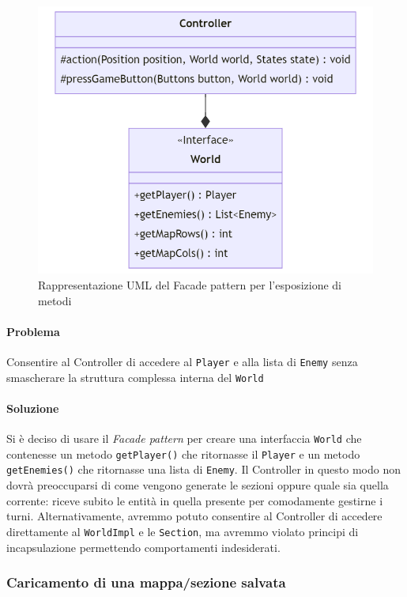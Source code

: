 \documentclass[a4paper,12pt]{report}
\begin{document}
\begin{figure}[H]
	\centering{}
	\includegraphics[width=\textwidth]{img/WorldFacade.png}
	\caption{Rappresentazione UML del Facade pattern per l'esposizione di metodi}
	\label{img:WorldFacade}
\end{figure}

\paragraph{Problema} Consentire al Controller di accedere al \texttt{Player} e alla lista di \texttt{Enemy} senza smascherare la struttura complessa interna del \texttt{World}
\paragraph{Soluzione} Si è deciso di usare il \textit{Facade pattern} per creare una interfaccia \texttt{World} che contenesse un metodo \texttt{getPlayer()} che ritornasse il \texttt{Player} e un metodo \texttt{getEnemies()} che ritornasse una lista di \texttt{Enemy}. Il Controller in questo modo non dovrà preoccuparsi di come vengono generate le sezioni oppure quale sia quella corrente: riceve subito le entità in quella presente per comodamente gestirne i turni. Alternativamente, avremmo potuto consentire al Controller di accedere direttamente al \texttt{WorldImpl} e le \texttt{Section}, ma avremmo violato principi di incapsulazione permettendo comportamenti indesiderati.

\subsubsection*{Caricamento di una mappa/sezione salvata}
\end{document}
